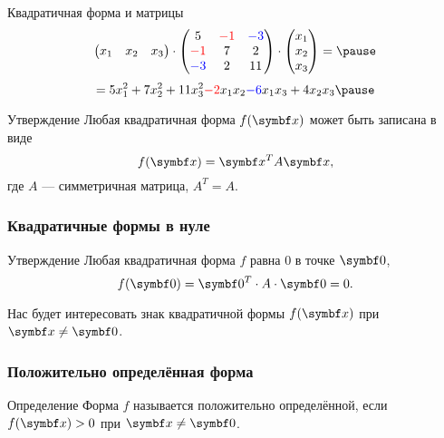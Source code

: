 \begin{frame}{Квадратичная форма и матрицы}
\[
\begin{pmatrix}
    x_1 & x_2 & x_3 
\end{pmatrix} \cdot \begin{pmatrix}
    5 & \red{-1} & \blue{-3} \\
    \red{-1} & 7 & 2 \\
    \blue{-3} & 2 & 11 \\
\end{pmatrix} \cdot 
\begin{pmatrix}
    x_1 \\
     x_2 \\ 
     x_3 \\
\end{pmatrix} = \pause
\]
\[
 = 5x_1^2 + 7x_2^2 + 11x_3^2 \red{- 2}x_1 x_2 \blue{- 6}x_1 x_3 + 4 x_2 x_3 \pause
\]
    
\begin{block}{Утверждение}
    Любая квадратичная форма $f(\bx)$ может быть записана в виде 
    \[
      f(\bx) = \bx^T A \bx,  
    \]
    где $A$ — симметричная матрица, $A^T = A$.
\end{block}


\end{frame}


\begin{frame}
    \frametitle{Квадратичные формы в нуле}

    \begin{block}{Утверждение}
        Любая квадратичная форма $f$ равна $0$ в точке $\bzero$,
        \[
        f(\bzero)  = \bzero^T \cdot A \cdot \bzero = 0.
        \]
    \end{block}
    \pause
    Нас будет интересовать знак квадратичной формы $f(\bx)$ при $\bx \neq \bzero$.

\end{frame}


\begin{frame}
    \frametitle{Положительно определённая форма}

    \begin{block}{Определение}
        Форма $f$ называется \alert{положительно определённой}, если $f(\bx) > 0$ при $\bx\neq\bzero$.
    \end{block}

    

\end{frame}